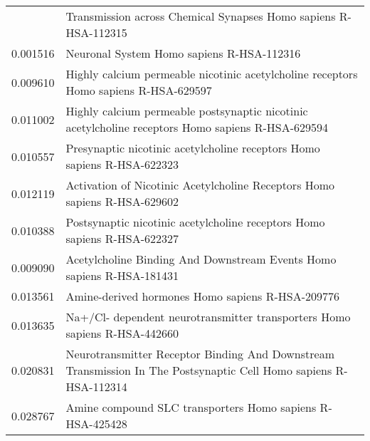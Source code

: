 \begin{longtable}{p{2.4cm}p{14.5cm}}
\bottomrule
\endlastfoot
                 0.000525 &                                                    Transmission across Chemical Synapses Homo sapiens R-HSA-112315 \\
                 0.001516 &                                                                          Neuronal System Homo sapiens R-HSA-112316 \\
                 0.009610 &                               Highly calcium permeable nicotinic acetylcholine receptors Homo sapiens R-HSA-629597 \\
                 0.011002 &                  Highly calcium permeable postsynaptic nicotinic acetylcholine receptors Homo sapiens R-HSA-629594 \\
                 0.010557 &                                            Presynaptic nicotinic acetylcholine receptors Homo sapiens R-HSA-622323 \\
                 0.012119 &                                          Activation of Nicotinic Acetylcholine Receptors Homo sapiens R-HSA-629602 \\
                 0.010388 &                                           Postsynaptic nicotinic acetylcholine receptors Homo sapiens R-HSA-622327 \\
                 0.009090 &                                              Acetylcholine Binding And Downstream Events Homo sapiens R-HSA-181431 \\
                 0.013561 &                                                                   Amine-derived hormones Homo sapiens R-HSA-209776 \\
                 0.013635 &                                          Na+/Cl- dependent neurotransmitter transporters Homo sapiens R-HSA-442660 \\
                 0.020831 &  Neurotransmitter Receptor Binding And Downstream Transmission In The  Postsynaptic Cell Homo sapiens R-HSA-112314 \\
                 0.028767 &                                                          Amine compound SLC transporters Homo sapiens R-HSA-425428 \\
\end{longtable}


